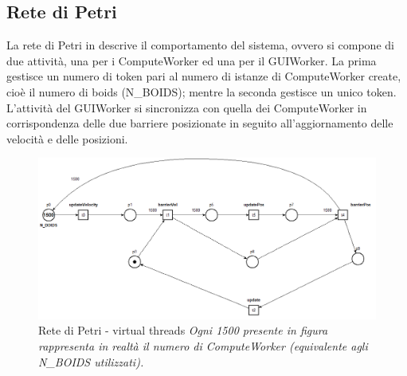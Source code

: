 \documentclass[a4paper,12pt]{report}
\begin{document}
\subsection{Rete di Petri}
La rete di Petri in  descrive il comportamento del sistema, ovvero si compone di due attività, una per i ComputeWorker ed una per il GUIWorker. La prima gestisce un numero di token pari al numero di istanze di ComputeWorker create, cioè il numero di boids (N\_BOIDS); mentre la seconda gestisce un unico token. L'attività del GUIWorker si sincronizza con quella dei ComputeWorker in corrispondenza delle due barriere posizionate in seguito all'aggiornamento delle velocità e delle posizioni.
\begin{figure}[H]
    \centering
    \includegraphics[width=\linewidth]{figures/virtualthreads.png}
    \caption{\centering Rete di Petri - virtual threads \newline \textit{Ogni 1500 presente in figura rappresenta in realtà il numero di ComputeWorker (equivalente agli N\_BOIDS utilizzati).}}
    \label{fig:petri-net-virtual-threads}
\end{figure}

\end{document}
